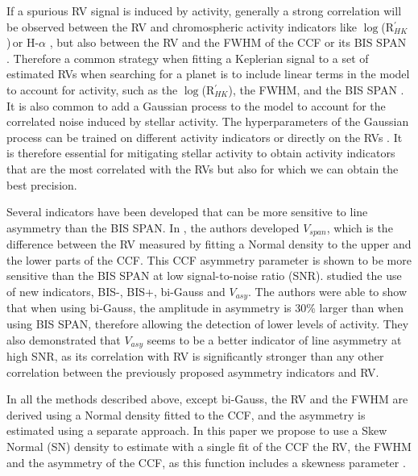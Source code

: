 \documentclass{aa}
\def\logrhk{$\log$(R$^{\prime}_{HK}$)}
\begin{document}
If a spurious RV signal is induced by activity, generally a strong correlation will be observed between the RV and chromospheric activity indicators like \logrhk\,or H-$\alpha$ \citep{Boisse-2009,Dumusque-2012,Robertson-2014}, but also between the RV and the FWHM of the CCF or its BIS SPAN \citep[][]{Queloz-2001,Boisse-2009,Queloz-2009,Dumusque-2016a}. 
%
Therefore a common strategy when fitting a Keplerian signal to a set of estimated RVs when searching for a planet is to include linear terms in the model to account for activity, such as the \logrhk, the FWHM, and the BIS SPAN \citep{Dumusque:2017aa,Feng:2017aa}.
%
It is also common to add a Gaussian process to the model to account for the correlated noise induced by stellar activity. The hyperparameters of the Gaussian process can be trained on different activity indicators \citep{Haywood-2014,Rajpaul-2015} or directly on the RVs \citep{Faria-2016a}. It is therefore essential for mitigating stellar activity to obtain activity indicators that are the most correlated with the RVs but also for which we can obtain the best precision.

Several indicators have been developed that can be more sensitive to line asymmetry than the BIS SPAN. In \citet{Boisse-2011}, the authors developed $V_{span}$, which is the difference between the RV measured by fitting a Normal density to the upper and the lower parts of the CCF. This CCF asymmetry parameter is shown to be more sensitive than the BIS SPAN at low signal-to-noise ratio (SNR).
%
\citet{Figueira-2013} studied the use of new indicators, BIS-, BIS+, bi-Gauss and $V_{asy}$. The authors were able to show that when using bi-Gauss, the amplitude in asymmetry is 30\% larger than when using BIS SPAN, therefore allowing the detection of lower levels of activity. They also demonstrated that $V_{asy}$ seems to be a better indicator of line asymmetry at high SNR, as its correlation with RV is significantly stronger than any other correlation between the previously proposed asymmetry indicators and RV.

In all the methods described above, except bi-Gauss, the RV and the FWHM are derived using a Normal density fitted to the CCF, and the asymmetry is estimated using a separate approach. 
%
In this paper we propose to use a Skew Normal (SN) density to estimate with a single fit of the CCF the RV, the FWHM and the asymmetry of the CCF, as this function includes a skewness parameter \citep[][]{Azzalini1985}. 
\end{document}
